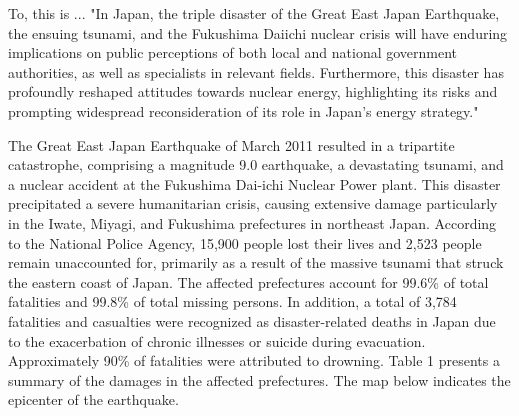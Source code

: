 \documentclass[12pt,halfline,a4paper]{ouparticle}
\begin{document}
 To, this is ... "In Japan, the triple disaster of the Great East Japan Earthquake, the ensuing tsunami, and the Fukushima Daiichi nuclear crisis will have enduring implications on public perceptions of both local and national government authorities, as well as specialists in relevant fields. Furthermore, this disaster has profoundly reshaped attitudes towards nuclear energy, highlighting its risks and prompting widespread reconsideration of its role in Japan's energy strategy."


The Great East Japan Earthquake of March 2011 resulted in a tripartite catastrophe, comprising a magnitude 9.0 earthquake, a devastating tsunami, and a nuclear accident at the Fukushima Dai-ichi Nuclear Power plant. This disaster precipitated a severe humanitarian crisis, causing extensive damage particularly in the Iwate, Miyagi, and Fukushima prefectures in northeast Japan. According to the National Police Agency, 15,900 people lost their lives and 2,523 people remain unaccounted for, primarily as a result of the massive tsunami that struck the eastern coast of Japan. The affected prefectures account for 99.6\% of total fatalities and 99.8\% of total missing persons. In addition, a total of 3,784 fatalities and casualties were recognized as disaster-related deaths in Japan due to the exacerbation of chronic illnesses or suicide during evacuation. Approximately 90\% of fatalities were attributed to drowning. Table 1 presents a summary of the damages in the affected prefectures. The map below indicates the epicenter of the earthquake.
\end{document}
